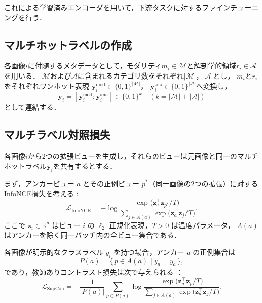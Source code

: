 これによる学習済みエンコーダを用いて，下流タスクに対するファインチューニングを行う．

\subsection{マルチホットラベルの作成}
各画像$i$に付随するメタデータとして，モダリティ$m_i \in \mathcal{M}$と解剖学的領域$r_i \in \mathcal{A}$を用いる．
$\mathcal{M}$および$\mathcal{A}$に含まれるカテゴリ数をそれぞれ$|\mathcal{M}|$，$|\mathcal{A}|$とし，
$m_i$と$r_i$をそれぞれワンホット表現
$\mathbf y_i^{\mathrm{mod}}\in\{0,1\}^{|\mathcal{M}|}$，
$\mathbf y_i^{\mathrm{ana}}\in\{0,1\}^{|\mathcal{A}|}$へ変換し，
\[
\mathbf y_i=[\mathbf y_i^{\mathrm{mod}};\mathbf y_i^{\mathrm{ana}}]\in\{0,1\}^{k}
\quad (k=|\mathcal{M}|+|\mathcal{A}| )
\]
として連結する．

\subsection{マルチラベル対照損失}
各画像$i$から2つの拡張ビューを生成し，それらのビューは元画像と同一のマルチホットラベル$\mathbf y_i$を共有するとする．

まず，アンカービュー $a$ とその正例ビュー $p^\ast$（同一画像の2つの拡張）に対するInfoNCE損失\cite{oord_representation_2018}を考える :
\begin{equation}
  \mathcal{L}_{\mathrm{InfoNCE}}
  = -\log
    \frac{\exp\!\bigl(\mathbf z_a^{\top}\mathbf z_{p^\ast}/T\bigr)}
         {\displaystyle\sum_{j \in A(a)}
          \exp\!\bigl(\mathbf z_a^{\top}\mathbf z_j / T\bigr)} .
  \label{eq:step1}
\end{equation}
ここで $\mathbf z_i \in \mathbb{R}^d$ はビュー $i$ の $\ell_2$ 正規化表現，$T>0$ は温度パラメータ，
$A(a)$ はアンカーを除く同一バッチ内の全ビュー集合である．

各画像が明示的なクラスラベル $y_i$ を持つ場合，アンカー $a$ の正例集合は
\[
  P(a)=\{\,p \in A(a)\mid y_p=y_a\,\},
\]
であり，教師ありコントラスト損失は次で与えられる \cite{khosla2020supervised}：
\begin{equation}
  \mathcal{L}_{\mathrm{SupCon}}
  = -\frac{1}{|P(a)|}
    \sum_{p\in P(a)}
    \log\frac{\exp\!\bigl(\mathbf z_a^{\top}\mathbf z_p/T\bigr)}
              {\displaystyle\sum_{j \in A(a)}
               \exp\!\bigl(\mathbf z_a^{\top}\mathbf z_j/T\bigr)} .
  \label{eq:step2}
\end{equation}

